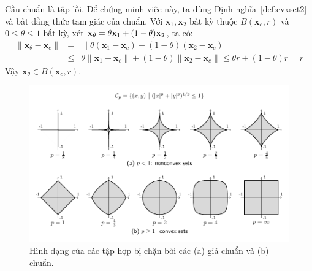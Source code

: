Cầu chuẩn là tập lồi. Để chứng minh việc này, ta dùng Định nghĩa~\ref{def:cvxset2} và
bất đẳng thức tam giác của chuẩn. Với $\mathbf{x}_1, \mathbf{x}_2$ bất kỳ thuộc
$B(\mathbf{x}_c, r)$ và $0 \leq \theta \leq 1$ bất kỳ, xét $\mathbf{x}_{\theta} =
\theta \mathbf{x}_1 + (1 - \theta)\mathbf{x}_2$, ta có:
\begin{eqnarray*}
\|\mathbf{x}_{\theta} - \mathbf{x}_c\| &=& \|\theta(\mathbf{x}_1 - \mathbf{x}_c)  + (1 - \theta) (\mathbf{x}_2 - \mathbf{x}_c)\| \\\
&\leq& \theta \|\mathbf{x}_1 - \mathbf{x}_c\| + (1 - \theta)\|\mathbf{x}_2 - \mathbf{x}_c\|
\leq \theta r + ( 1 - \theta) r = r
\end{eqnarray*}
Vậy $\mathbf{x}_{\theta} \in B(\mathbf{x}_c, r)$.




\begin{figure}[t]
\centering
\includegraphics[width = \textwidth]{Chapters/08_ConvexOptimization/16_convexity/latex/normballs.pdf}
\caption[]{Hình dạng của các tập hợp bị chặn bởi  các (a) giả chuẩn và
(b) chuẩn.} \label{fig:16_normballs}
\end{figure}

